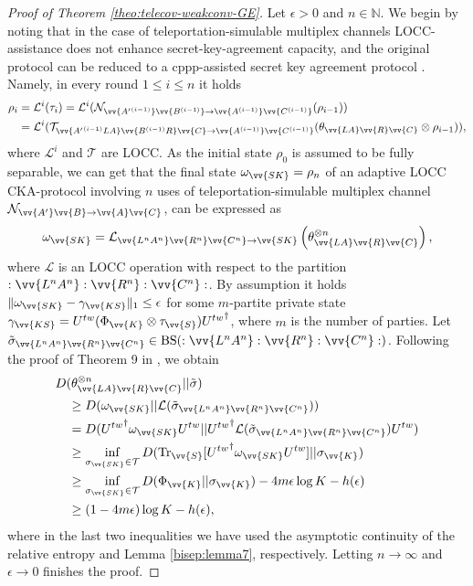 \documentclass[aps,pra,twocolumn,superscriptaddress,longbibliography]{revtex4-1}
\def\Tr{\operatorname{Tr}}
\def\BS{\operatorname{BS}}
\def\({\left(}
\def\){\right)}
\newcommand{\mc}[1]{\mathcal{#1}}
\begin{document}
\begin{appendix}
\begin{proof}[Proof of Theorem \ref{theo:telecov-weakconv-GE}]
Let $\epsilon>0$ and $n\in\mathbb{N}$. We begin by noting that in the case of teleportation-simulable multiplex channels LOCC-assistance does not enhance secret-key-agreement capacity, and the original protocol can be reduced to a cppp-assisted secret key agreement protocol \cite{PLOB15}. Namely, in every round $1\leq i \leq n$ it holds 
\begin{align}
\rho_i&=\mc{L}^i(\tau_i)=\mc{L}^i(\mc{N}_{\vv{{A'}^{(i-1)}}\vv{B^{(i-1)}}\to\vv{A^{(i-1)}}\vv{C^{(i-1)}}}(\rho_{i-1}))\\
&=\mc{L}^i(\mc{T}_{\vv{{A'}^{(i-1)}LA}\vv{B^{(i-1)}R}\vv{C}\to\vv{A^{(i-1)}}\vv{C^{(i-1)}}}(\theta_{\vv{LA}\vv{R}\vv{C}}\otimes\rho_{i-1})),
\end{align}
where $\mc{L}^i$ and $\mc{T}$ are LOCC. As the initial state $\rho_0$ is assumed to be fully separable, we can get that the final state $\omega_{\vv{SK}}=\rho_n$ of an adaptive LOCC CKA-protocol involving $n$ uses of teleportation-simulable multiplex channel $\mc{N}_{\vv{A'}\vv{B}\to\vv{A}\vv{C}}$, can be expressed as
\begin{equation}
\omega_{\vv{SK}}=\mc{L}_{\vv{L^nA^n}\vv{R^n}\vv{C^n}\to\vv{SK}}\(\theta^{\otimes n}_{\vv{LA}\vv{R}\vv{C}}\),
\end{equation}
where $\mc{L}$ is an LOCC operation with respect to the partition $:\vv{L^nA^n}:\vv{R^n}:\vv{C^n}:$. 
By assumption it holds $\|\omega_{\vv{SK}}-\gamma_{\vv{KS}}\|_1\leq\epsilon$ for some $m$-partite private state $\gamma_{\vv{KS}}=U^{tw}(\Phi_{\vv{K}}\otimes\tau_{\vv{S}}){U^{tw}}^\dagger$, where $m$ is the number of parties. Let $\tilde{\sigma}_{\vv{L^nA^n}\vv{R^n}\vv{C^n}}\in\BS(:\vv{L^nA^n}:\vv{R^n}:\vv{C^n}:)$. Following the proof of Theorem 9 in \cite{HHHO09}, we obtain 
\begin{align}
&D(\theta^{\otimes n}_{\vv{LA}\vv{R}\vv{C}}||\tilde{\sigma}) \nonumber\\
&\quad \geq D(\omega_{\vv{SK}}||\mc{L}(\tilde{\sigma}_{\vv{L^nA^n}\vv{R^n}\vv{C^n}}))\\
&~~~=D({U^{tw}}^\dagger\omega_{\vv{SK}}{U^{tw}}||{U^{tw}}^\dagger\mc{L}(\tilde{\sigma}_{\vv{L^nA^n}\vv{R^n}\vv{C^n}}){U^{tw}})\\
&\quad \geq\inf_{\sigma_{\vv{SK}}\in\mc{T}}D(\Tr_{\vv{S}}[{U^{tw}}^\dagger\omega_{\vv{SK}}{U^{tw}}]||\sigma_{\vv{K}})\\
&\quad \geq\inf_{\sigma_{\vv{SK}}\in\mc{T}}D(\Phi_{\vv{K}}||\sigma_{\vv{K}})-4m\epsilon\log{K}-h(\epsilon)\\
&\quad \geq(1-4m\epsilon)\log{K}-h(\epsilon),
\end{align}
where in the last two inequalities we have used the asymptotic continuity of the relative entropy and Lemma \ref{bisep:lemma7}, respectively. Letting $n\to\infty$ and $\epsilon\to0$ finishes the proof.



\end{proof}
\end{appendix}
\end{document}

